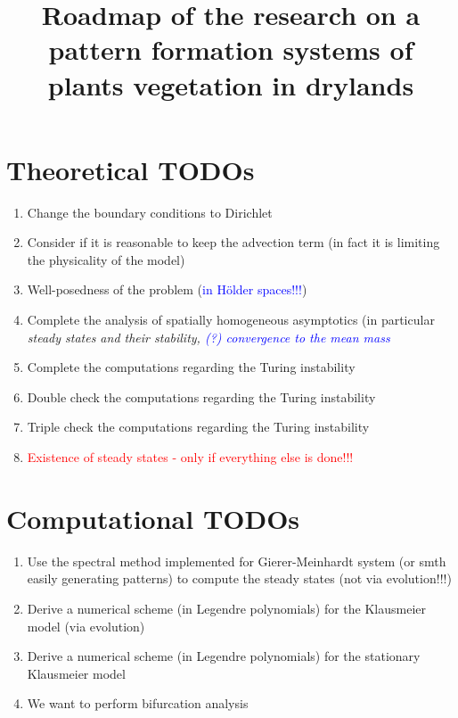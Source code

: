 \documentclass[12pt, a4paper]{article}
\title{Roadmap of the research on a pattern formation systems of plants vegetation in drylands}
\theoremstyle{break}
\theoremstyle{break}
\theoremstyle{break}
\theoremstyle{break}
\theoremstyle{break}
\theoremstyle{break}
\begin{document}
\maketitle

\section{Theoretical TODOs}

\begin{enumerate}
    \item Change the boundary conditions to Dirichlet
    \item Consider if it is reasonable to keep the advection term (in fact it is limiting the physicality of the model)
    \item Well-posedness of the problem (\textcolor{blue}{in H\"older spaces!!!})
    \item Complete the analysis of spatially homogeneous asymptotics (in particular \textit{steady states and their stability, \textcolor{blue}{(?) convergence to the mean mass}}
    \item Complete the computations regarding the Turing instability
    \item Double check the computations regarding the Turing instability
    \item Triple check the computations regarding the Turing instability
    \item \textcolor{red}{Existence of steady states - only if everything else is done!!!}
    
\end{enumerate}

\section{Computational TODOs}

\begin{enumerate}
    \item Use the spectral method implemented for Gierer-Meinhardt system (or smth easily generating patterns) to compute the steady states (not via evolution!!!)
    \item Derive a numerical scheme (in Legendre polynomials) for the Klausmeier model (via evolution)
    \item Derive a numerical scheme (in Legendre polynomials) for the stationary Klausmeier model
    \item We want to perform bifurcation analysis
    
\end{enumerate}
\end{document}
